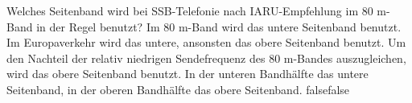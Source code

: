     {Welches Seitenband wird bei SSB-Telefonie nach IARU-Empfehlung im 80 m-Band in der Regel benutzt?}
    {Im 80 m-Band wird das untere Seitenband benutzt.}
    {Im Europaverkehr wird das untere, ansonsten das obere Seitenband benutzt.}
    {Um den Nachteil der relativ niedrigen Sendefrequenz des 80 m-Bandes auszugleichen, wird das obere Seitenband benutzt.}
    {In der unteren Bandhälfte das untere Seitenband, in der oberen Bandhälfte das obere Seitenband.}
    {false}{false}